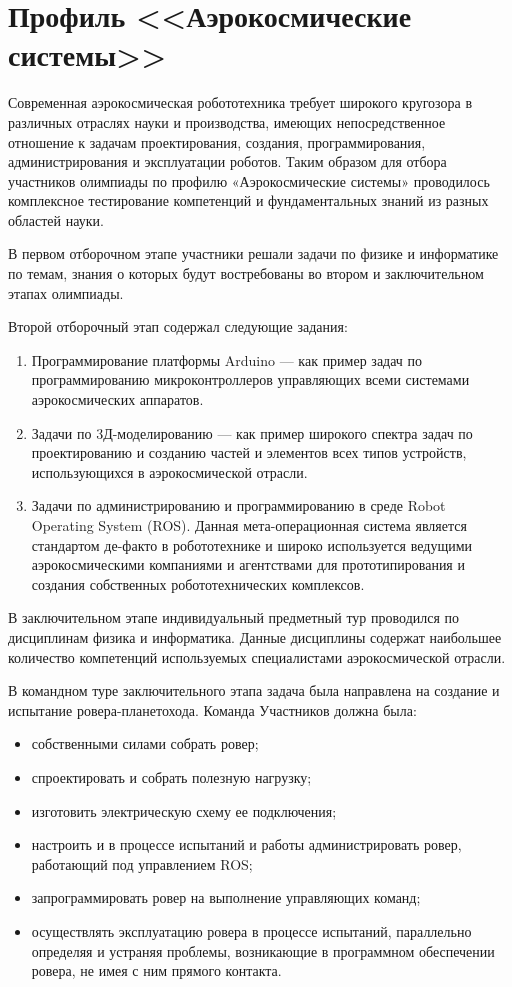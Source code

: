 

\chapter{Профиль <<Аэрокосмические системы>>}

Современная аэрокосмическая робототехника требует широкого кругозора в различных отраслях науки и производства, имеющих непосредственное отношение к задачам проектирования, создания, программирования, администрирования и эксплуатации роботов. Таким образом для отбора участников олимпиады по профилю «Аэрокосмические системы» проводилось комплексное тестирование компетенций и фундаментальных знаний из разных областей науки.

В первом отборочном этапе участники решали задачи по физике и информатике по темам, знания о которых будут востребованы во втором и заключительном этапах олимпиады.

Второй отборочный этап содержал следующие задания:
\begin{enumerate}
    \item Программирование платформы Arduino — как пример задач по программированию микроконтроллеров управляющих всеми системами аэрокосмических аппаратов.
    \item Задачи по 3Д-моделированию — как пример широкого спектра задач по проектированию и созданию частей и элементов всех типов устройств, использующихся в аэрокосмической отрасли.
    \item Задачи по администрированию и программированию в среде Robot Operating System (ROS). Данная мета-операционная система является стандартом де-факто в робототехнике и широко используется ведущими аэрокосмическими компаниями и агентствами для прототипирования и создания собственных робототехнических комплексов.
\end{enumerate}

В заключительном этапе индивидуальный предметный тур проводился по дисциплинам физика и информатика. Данные дисциплины содержат наибольшее количество компетенций используемых специалистами аэрокосмической отрасли.

В командном туре заключительного этапа задача была направлена на создание и испытание ровера-планетохода. Команда Участников должна была:
\begin{itemize}
    \item собственными силами собрать ровер;
    \item спроектировать и собрать полезную нагрузку;
    \item изготовить электрическую схему ее подключения;
    \item настроить и в процессе испытаний и работы администрировать ровер, работающий под управлением ROS;
    \item запрограммировать ровер на выполнение управляющих команд;
    \item осуществлять эксплуатацию ровера в процессе испытаний, параллельно определяя и устраняя проблемы, возникающие в программном обеспечении ровера, не имея с ним прямого контакта.
\end{itemize}

